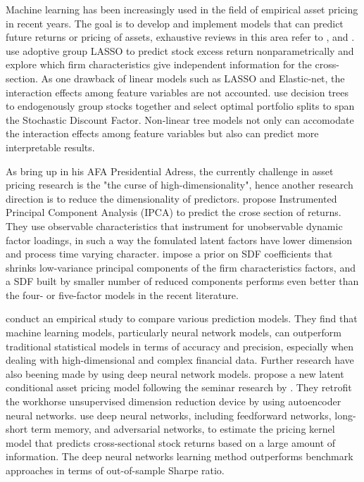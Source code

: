 Machine learning has been increasingly used in the field of empirical asset pricing in recent years. The goal is to develop and implement models that can predict future returns or pricing of assets, exhaustive reviews in this area refer to \citet*{giglio2022factor}, and \citet*{bagnara2022asset}. \citet*{freyberger2020dissecting} use adoptive group LASSO to predict stock excess return nonparametrically and explore which firm characteristics give independent information for the cross-section. As one drawback of linear models such as LASSO and Elastic-net, the interaction effects among feature variables are not accounted. \citet*{bryzgalova2020forest} use decision trees to endogenously group stocks together and select optimal portfolio splits to span the Stochastic Discount Factor. Non-linear tree models not only can accomodate the interaction effects among feature variables but also can predict more interpretable results. 

As \citet*{cochrane2011presidential} bring up in his AFA Presidential Adress, the currently challenge in asset pricing research is the "the curse of high-dimensionality", hence another research direction is to reduce the dimensionality of predictors. \citet*{kelly2019characteristics} propose Instrumented Principal Component Analysis (IPCA) to predict the crose section of returns. They use observable characteristics that instrument for unobservable dynamic factor loadings, in such a way the fomulated latent factors have lower dimension and process time varying character. \citet*{kozak2020shrinking} impose a prior on SDF coefficients that shrinks low-variance principal components of the firm characteristics factors, and a SDF built by smaller number of reduced components performs even better than the four- or five-factor models in the recent literature.

\citet*{gu2020empirical} conduct an empirical study to compare various prediction models. They find that machine learning models, particularly neural network models, can outperform traditional statistical models in terms of accuracy and precision, especially when dealing with high-dimensional and complex financial data. Further research have also beening made by using deep neural network models. \citet*{gu2019autoencoder} propose a new latent conditional asset pricing model following the seminar research by \citet*{kelly2019characteristics}. They retrofit the workhorse unsupervised dimension reduction device by using autoencoder neural networks. \citet*{chen2019deep} use deep neural networks, including feedforward networks, long-short term memory, and adversarial networks, to estimate the pricing kernel model that predicts cross-sectional stock returns based on a large amount of information. The deep neural networks learning method outperforms benchmark approaches in terms of out-of-sample Sharpe ratio.

